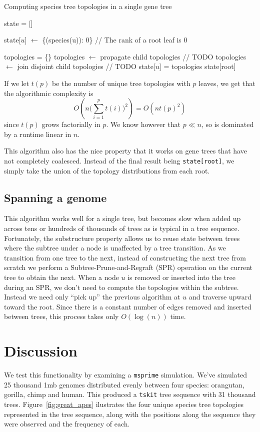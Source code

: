 \documentclass{article}
\newcommand{\tskit}{{\texttt{tskit}}}
\newcommand{\msprime}{{\texttt{msprime}}}
\begin{document}
\begin{algorithm}
\label{alg:dp_alg}
    \caption{Computing species tree topologies in a single gene tree}
    \begin{algorithmic}
        \State state = []

        \State state[$u$] $\leftarrow$ \{(species(u)): 0\} // The rank of a root leaf is 0
        \EndFor

            \State topologies = \{\}
            \State topologies $\leftarrow$ propagate child topologies // TODO
            \State topologies $\leftarrow$ join disjoint child topologies // TODO
            \State state[$u$] = topologies
        \EndFor
        \State \Return state[root]
    \end{algorithmic}
\end{algorithm}
If we let $t(p)$ be the number of unique tree topologies with $p$ leaves,
we get that the algorithmic complexity is
\[
    O(n \big(\sum_{i=1}^p t(i)\big)^2) = O(n t(p)^2)
\]
since $t(p)$ grows factorially in $p$. We know however that $p \ll n$, so is
dominated by a runtime linear in $n$.

This algorithm also has the nice property that it works on gene trees
that have not completely coalesced. Instead of the final result being
\texttt{state[root]}, we simply take the union of the topology distributions
from each root.

\subsection{Spanning a genome}
This algorithm works well for a single tree, but becomes slow when added up
across tens or hundreds of thousands of trees as is typical in a tree sequence.
Fortunately, the substructure property allows us to reuse state between trees
where the subtree under a node is unaffected by a tree transition.
As we transition from one tree to the next, instead of constructing
the next tree from scratch we perform a Subtree-Prune-and-Regraft (SPR) operation
on the current tree to obtain the next.
When a node $u$ is removed or inserted into the tree during an SPR, we don't
need to compute the topologies within the subtree.
Instead we need only ``pick up'' the previous algorithm at $u$ and traverse
upward toward the root.
Since there is a constant number of edges removed and inserted between trees,
this process takes only $O(\log(n))$ time.

\section{Discussion}
We test this functionality by examining a \msprime{} simulation. We've simulated
25 thousand 1mb genomes distributed evenly between four species: orangutan,
gorilla, chimp and human. This produced a \tskit{} tree sequence with
31 thousand trees. Figure~\ref{fig:great_apes} ilustrates the four unique
species tree topologies represented in the tree sequence, along with the positions
along the sequence they were observed and the frequency of each.
\end{document}
